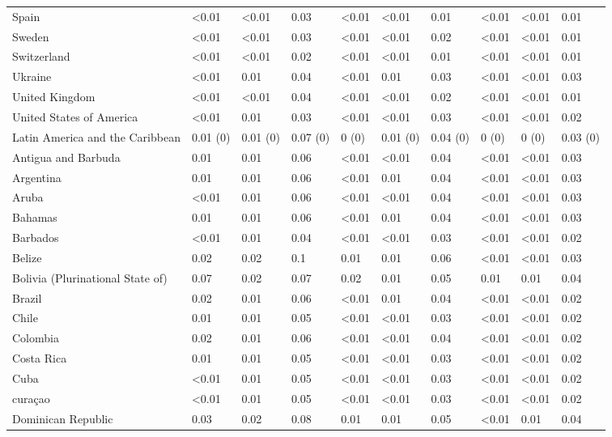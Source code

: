 \begin{longtable}[t]{llllllllll}
\addlinespace
Spain & <0.01 & <0.01 & 0.03 & <0.01 & <0.01 & 0.01 & <0.01 & <0.01 & 0.01\\
Sweden & <0.01 & <0.01 & 0.03 & <0.01 & <0.01 & 0.02 & <0.01 & <0.01 & 0.01\\
Switzerland & <0.01 & <0.01 & 0.02 & <0.01 & <0.01 & 0.01 & <0.01 & <0.01 & 0.01\\
Ukraine & <0.01 & 0.01 & 0.04 & <0.01 & 0.01 & 0.03 & <0.01 & <0.01 & 0.03\\
United Kingdom & <0.01 & <0.01 & 0.04 & <0.01 & <0.01 & 0.02 & <0.01 & <0.01 & 0.01\\
\addlinespace
United States of America & <0.01 & 0.01 & 0.03 & <0.01 & <0.01 & 0.03 & <0.01 & <0.01 & 0.02\\
Latin America and the Caribbean & 0.01 (0) & 0.01 (0) & 0.07 (0) & 0 (0) & 0.01 (0) & 0.04 (0) & 0 (0) & 0 (0) & 0.03 (0)\\
Antigua and Barbuda & 0.01 & 0.01 & 0.06 & <0.01 & <0.01 & 0.04 & <0.01 & <0.01 & 0.03\\
Argentina & 0.01 & 0.01 & 0.06 & <0.01 & 0.01 & 0.04 & <0.01 & <0.01 & 0.03\\
Aruba & <0.01 & 0.01 & 0.06 & <0.01 & <0.01 & 0.04 & <0.01 & <0.01 & 0.03\\
\addlinespace
Bahamas & 0.01 & 0.01 & 0.06 & <0.01 & 0.01 & 0.04 & <0.01 & <0.01 & 0.03\\
Barbados & <0.01 & 0.01 & 0.04 & <0.01 & <0.01 & 0.03 & <0.01 & <0.01 & 0.02\\
Belize & 0.02 & 0.02 & 0.1 & 0.01 & 0.01 & 0.06 & <0.01 & <0.01 & 0.03\\
Bolivia (Plurinational State of) & 0.07 & 0.02 & 0.07 & 0.02 & 0.01 & 0.05 & 0.01 & 0.01 & 0.04\\
Brazil & 0.02 & 0.01 & 0.06 & <0.01 & 0.01 & 0.04 & <0.01 & <0.01 & 0.02\\
\addlinespace
Chile & 0.01 & 0.01 & 0.05 & <0.01 & <0.01 & 0.03 & <0.01 & <0.01 & 0.02\\
Colombia & 0.02 & 0.01 & 0.06 & <0.01 & <0.01 & 0.04 & <0.01 & <0.01 & 0.02\\
Costa Rica & 0.01 & 0.01 & 0.05 & <0.01 & <0.01 & 0.03 & <0.01 & <0.01 & 0.02\\
Cuba & <0.01 & 0.01 & 0.05 & <0.01 & <0.01 & 0.03 & <0.01 & <0.01 & 0.02\\
curaçao & <0.01 & 0.01 & 0.05 & <0.01 & <0.01 & 0.03 & <0.01 & <0.01 & 0.02\\
\addlinespace
Dominican Republic & 0.03 & 0.02 & 0.08 & 0.01 & 0.01 & 0.05 & <0.01 & 0.01 & 0.04\\

\end{longtable}
